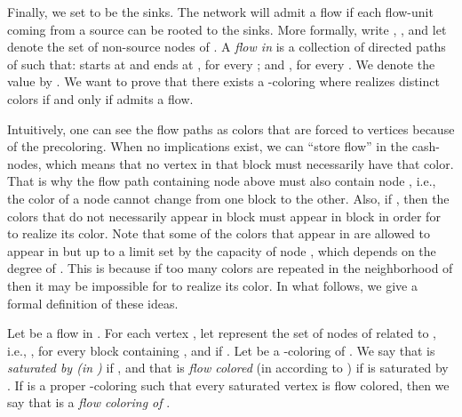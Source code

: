 \documentclass{llncs}
\begin{document}
Finally, we set  to be the sinks. The network will admit a flow if each flow-unit coming from a source can be rooted to the sinks. More formally, write , , and let  denote the set of non-source nodes of . A \emph{flow in } is a collection of directed paths  of  such that:  starts at  and ends at , for every ; and , for every . We denote the value  by .
We want to prove that there exists a -coloring where  realizes distinct colors if and only if  admits a flow.

Intuitively, one can see the flow paths as colors that are forced to vertices because of the precoloring. When no implications exist, we can ``store flow'' in the cash-nodes, which means that no vertex in that block must necessarily have that color. That is why the flow path containing node  above must also contain node , i.e., the color of a node cannot change from one block to the other. Also, if , then the colors that do not necessarily appear in block  must appear in block  in order for  to realize its color. Note that some of the colors that appear in  are allowed to appear in  but up to a limit set by the capacity of node , which depends on the degree of . This is because if too many colors are repeated in the neighborhood of  then it may be impossible for  to realize its color. In what follows, we give a formal definition of these ideas.

Let  be a flow in . For each vertex , let  represent the set of nodes of  related to , i.e., , for every block  containing , and  if . Let  be a -coloring of . We say that  is \emph{saturated by  (in )} if , and that  is \emph{flow colored} (in  according to ) if  is saturated by . If  is a proper -coloring such that every saturated vertex is flow colored, then we say that  is a \emph{flow coloring of }.
\end{document}
